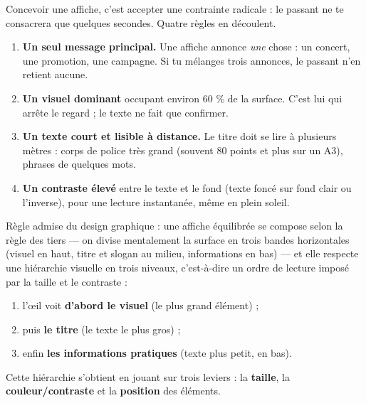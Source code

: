 \documentclass[11pt]{article}
\newcommand{\cle}[1]{{\popxbold\color{popdark}#1}}
\newcounter{popsec}
\newcounter{popsub}
\newcommand{\courssub}[1]{%
  \stepcounter{popsub}%
  \par\vspace{9pt}\noindent{\popxbold\fontsize{11.5}{13}\selectfont\color{popink}{\color{poporange}\thepopsec.\thepopsub}\hspace{6pt}#1}\par\nopagebreak\vspace{4pt}
}
\begin{document}
\courssub{Les règles de conception}

Concevoir une affiche, c'est accepter une contrainte radicale : le passant ne te consacrera que quelques secondes. Quatre règles en découlent.

\begin{enumerate}
\item \textbf{Un seul message principal.} Une affiche annonce \emph{une} chose : un concert, une promotion, une campagne. Si tu mélanges trois annonces, le passant n'en retient aucune.
\item \textbf{Un visuel dominant} occupant environ 60 \% de la surface. C'est lui qui arrête le regard ; le texte ne fait que confirmer.
\item \textbf{Un texte court et lisible à distance.} Le titre doit se lire à plusieurs mètres : corps de police très grand (souvent 80 points et plus sur un A3), phrases de quelques mots.
\item \textbf{Un contraste élevé} entre le texte et le fond (texte foncé sur fond clair ou l'inverse), pour une lecture instantanée, même en plein soleil.
\end{enumerate}

\begin{propriete}
Règle admise du design graphique : une affiche équilibrée se compose selon la \cle{règle des tiers} — on divise mentalement la surface en trois bandes horizontales (visuel en haut, titre et slogan au milieu, informations en bas) — et elle respecte une \cle{hiérarchie visuelle} en trois niveaux, c'est-à-dire un ordre de lecture imposé par la taille et le contraste :
\begin{enumerate}
\item l'œil voit \textbf{d'abord le visuel} (le plus grand élément) ;
\item puis \textbf{le titre} (le texte le plus gros) ;
\item enfin \textbf{les informations pratiques} (texte plus petit, en bas).
\end{enumerate}
Cette hiérarchie s'obtient en jouant sur trois leviers : la \textbf{taille}, la \textbf{couleur/contraste} et la \textbf{position} des éléments.
\end{propriete}
\end{document}

